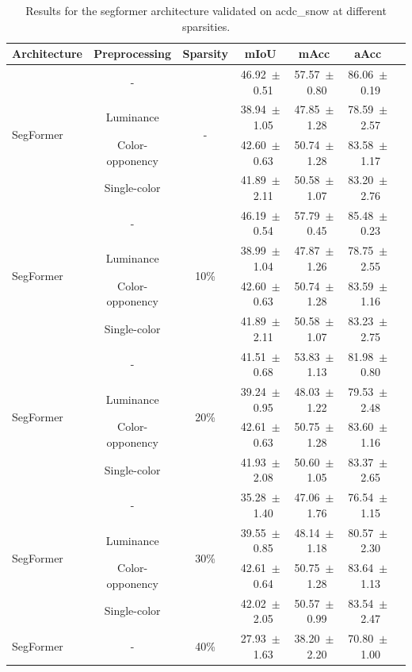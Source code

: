 \begin{table}[h]
\centering
\caption{Results for the segformer architecture validated on acdc_snow at different sparsities.}
\begin{tabular}{@{}lccc ccc@{}}
\toprule
Architecture & Preprocessing & Sparsity & mIoU & mAcc & aAcc \\
\midrule

\multirow{4}{*}{SegFormer} & - & \multirow{4}{*}{-} & 46.92~$\pm$~0.51 & 57.57~$\pm$~0.80 & 86.06~$\pm$~0.19 \\
& Luminance & & 38.94~$\pm$~1.05 & 47.85~$\pm$~1.28 & 78.59~$\pm$~2.57 \\
& Color-opponency & & 42.60~$\pm$~0.63 & 50.74~$\pm$~1.28 & 83.58~$\pm$~1.17 \\
& Single-color & & 41.89~$\pm$~2.11 & 50.58~$\pm$~1.07 & 83.20~$\pm$~2.76 \\
\midrule
\multirow{4}{*}{SegFormer} & - & \multirow{4}{*}{10\%} & 46.19~$\pm$~0.54 & 57.79~$\pm$~0.45 & 85.48~$\pm$~0.23 \\
& Luminance & & 38.99~$\pm$~1.04 & 47.87~$\pm$~1.26 & 78.75~$\pm$~2.55 \\
& Color-opponency & & 42.60~$\pm$~0.63 & 50.74~$\pm$~1.28 & 83.59~$\pm$~1.16 \\
& Single-color & & 41.89~$\pm$~2.11 & 50.58~$\pm$~1.07 & 83.23~$\pm$~2.75 \\
\midrule
\multirow{4}{*}{SegFormer} & - & \multirow{4}{*}{20\%} & 41.51~$\pm$~0.68 & 53.83~$\pm$~1.13 & 81.98~$\pm$~0.80 \\
& Luminance & & 39.24~$\pm$~0.95 & 48.03~$\pm$~1.22 & 79.53~$\pm$~2.48 \\
& Color-opponency & & 42.61~$\pm$~0.63 & 50.75~$\pm$~1.28 & 83.60~$\pm$~1.16 \\
& Single-color & & 41.93~$\pm$~2.08 & 50.60~$\pm$~1.05 & 83.37~$\pm$~2.65 \\
\midrule
\multirow{4}{*}{SegFormer} & - & \multirow{4}{*}{30\%} & 35.28~$\pm$~1.40 & 47.06~$\pm$~1.76 & 76.54~$\pm$~1.15 \\
& Luminance & & 39.55~$\pm$~0.85 & 48.14~$\pm$~1.18 & 80.57~$\pm$~2.30 \\
& Color-opponency & & 42.61~$\pm$~0.64 & 50.75~$\pm$~1.28 & 83.64~$\pm$~1.13 \\
& Single-color & & 42.02~$\pm$~2.05 & 50.57~$\pm$~0.99 & 83.54~$\pm$~2.47 \\
\midrule
\multirow{4}{*}{SegFormer} & - & \multirow{4}{*}{40\%} & 27.93~$\pm$~1.63 & 38.20~$\pm$~2.20 & 70.80~$\pm$~1.00 \\

\end{tabular}
\end{table}
